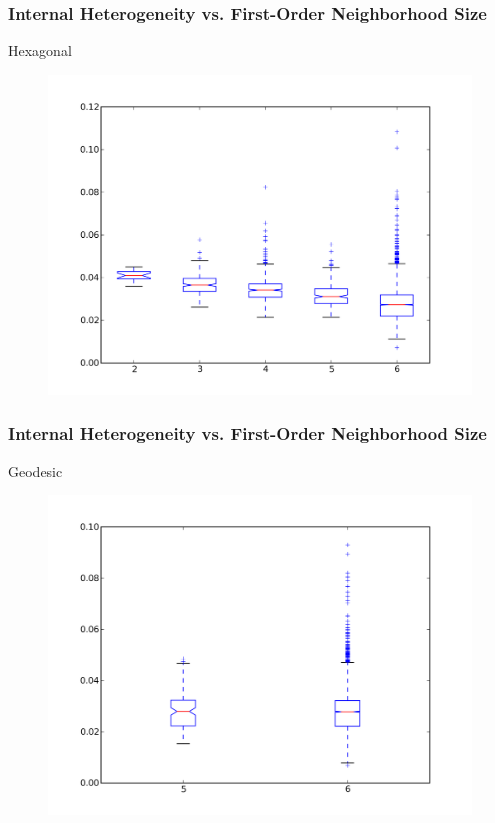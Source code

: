\documentclass[nototal,handout]{beamer}
\begin{document}
\begin{frame}
	\frametitle{Internal Heterogeneity vs. First-Order Neighborhood Size}
 
\begin{block}{Hexagonal}
  \begin{center}
  \begin{figure}
  \includegraphics[width=0.75\linewidth]{hex_iv_box.png}
  \end{figure}
  \end{center}
 \end{block} \end{frame} 

\begin{frame}
	\frametitle{Internal Heterogeneity vs. First-Order Neighborhood Size}
 
\begin{block}{Geodesic}
  \begin{center}
  \begin{figure}
  \includegraphics[width=0.75\linewidth]{geodesic_iv_box.png}
  \end{figure}
  \end{center}
 \end{block} \end{frame} 
\end{document}
